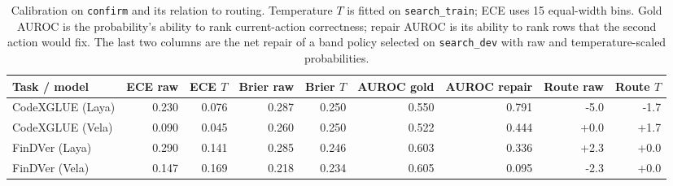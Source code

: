 \begin{table}[t]
\centering
\small
\caption{Calibration on \texttt{confirm} and its relation to routing.
Temperature $T$ is fitted on \texttt{search\_train}; ECE uses 15 equal-width
bins. Gold AUROC is the probability's ability to rank current-action
correctness; repair AUROC is its ability to rank rows that the second action
would fix. The last two columns are the net repair of a band policy selected
on \texttt{search\_dev} with raw and temperature-scaled probabilities.}
\label{tab:calibration}
\begin{tabular}{@{}lrrrrrrrr@{}}
\toprule
Task / model & ECE raw & ECE $T$ & Brier raw & Brier $T$ & AUROC gold & AUROC repair & Route raw & Route $T$ \\
\midrule
CodeXGLUE (Laya) & 0.230 & 0.076 & 0.287 & 0.250 & 0.550 & 0.791 & -5.0 & -1.7 \\
CodeXGLUE (Vela) & 0.090 & 0.045 & 0.260 & 0.250 & 0.522 & 0.444 & +0.0 & +1.7 \\
FinDVer (Laya) & 0.290 & 0.141 & 0.285 & 0.246 & 0.603 & 0.336 & +2.3 & +0.0 \\
FinDVer (Vela) & 0.147 & 0.169 & 0.218 & 0.234 & 0.605 & 0.095 & -2.3 & +0.0 \\
\bottomrule
\end{tabular}
\end{table}
